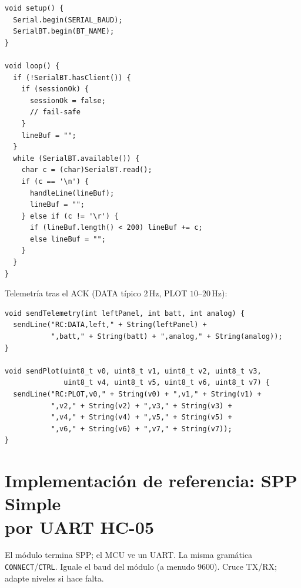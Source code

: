 \documentclass[12pt,a4paper]{article}
\begin{document}
\begin{lstlisting}
void setup() {
  Serial.begin(SERIAL_BAUD);
  SerialBT.begin(BT_NAME);
}

void loop() {
  if (!SerialBT.hasClient()) {
    if (sessionOk) {
      sessionOk = false;
      // fail-safe
    }
    lineBuf = "";
  }
  while (SerialBT.available()) {
    char c = (char)SerialBT.read();
    if (c == '\n') {
      handleLine(lineBuf);
      lineBuf = "";
    } else if (c != '\r') {
      if (lineBuf.length() < 200) lineBuf += c;
      else lineBuf = "";
    }
  }
}
\end{lstlisting}

Telemetría tras el ACK (DATA típico $2$\,Hz, PLOT $10$--$20$\,Hz):

\begin{lstlisting}
void sendTelemetry(int leftPanel, int batt, int analog) {
  sendLine("RC:DATA,left," + String(leftPanel) +
           ",batt," + String(batt) + ",analog," + String(analog));
}

void sendPlot(uint8_t v0, uint8_t v1, uint8_t v2, uint8_t v3,
              uint8_t v4, uint8_t v5, uint8_t v6, uint8_t v7) {
  sendLine("RC:PLOT,v0," + String(v0) + ",v1," + String(v1) +
           ",v2," + String(v2) + ",v3," + String(v3) +
           ",v4," + String(v4) + ",v5," + String(v5) +
           ",v6," + String(v6) + ",v7," + String(v7));
}
\end{lstlisting}

\section{\texorpdfstring{Implementación de referencia: SPP Simple\\[0.15em]por UART HC-05}{Implementación de referencia: SPP Simple por UART HC-05}}
\label{sec:code-hc05}

El módulo termina SPP; el MCU ve un UART.
La misma gramática \texttt{CONNECT}/\texttt{CTRL}.
Iguale el baud del módulo (a menudo 9600). Cruce TX/RX; adapte niveles
si hace falta.
\end{document}
